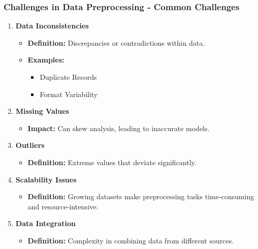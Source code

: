 \documentclass[aspectratio=169]{beamer}
\begin{document}
\begin{frame}[fragile]
    \frametitle{Challenges in Data Preprocessing - Common Challenges}
    \begin{enumerate}
        \item \textbf{Data Inconsistencies}
            \begin{itemize}
                \item \textbf{Definition:} Discrepancies or contradictions within data.
                \item \textbf{Examples:}
                    \begin{itemize}
                        \item Duplicate Records
                        \item Format Variability
                    \end{itemize}
            \end{itemize}
        \item \textbf{Missing Values}
            \begin{itemize}
                \item \textbf{Impact:} Can skew analysis, leading to inaccurate models.
            \end{itemize}
        \item \textbf{Outliers}
            \begin{itemize}
                \item \textbf{Definition:} Extreme values that deviate significantly.
            \end{itemize}
        \item \textbf{Scalability Issues}
            \begin{itemize}
                \item \textbf{Definition:} Growing datasets make preprocessing tasks time-consuming and resource-intensive.
            \end{itemize}
        \item \textbf{Data Integration}
            \begin{itemize}
                \item \textbf{Definition:} Complexity in combining data from different sources.
            \end{itemize}
    \end{enumerate}
\end{frame}
\end{document}
